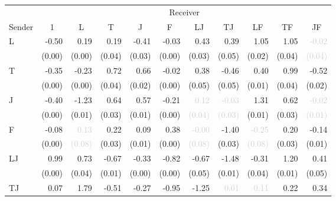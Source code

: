 \begin{tabular}{lrrrrrrrrrr}
\toprule
& \multicolumn{10}{c}{Receiver} \\
\cmidrule(l){2-11} 
Sender & \multicolumn{1}{c}{1} & \multicolumn{1}{c}{L} & \multicolumn{1}{c}{T} & \multicolumn{1}{c}{J} & \multicolumn{1}{c}{F} & \multicolumn{1}{c}{LJ} & \multicolumn{1}{c}{TJ} & \multicolumn{1}{c}{LF} & \multicolumn{1}{c}{TF} & \multicolumn{1}{c}{JF} \\
\midrule
\multirow{2}{*}{L} &-0.50 &\cellcolor{Gray}0.19 &0.19 &-0.41 &-0.03 &0.43 &0.39 &1.05 &1.05 &\textcolor{LightGray}{-0.02}\\
 &\tiny{(0.00)} &\cellcolor{Gray}\tiny{(0.00)} &\tiny{(0.04)} &\tiny{(0.03)} &\tiny{(0.00)} &\tiny{(0.03)} &\tiny{(0.05)} &\tiny{(0.02)} &\tiny{(0.04)} &\textcolor{LightGray}{\tiny{(0.04)}}\\[1ex]
\multirow{2}{*}{T} &-0.35 &-0.23 &\cellcolor{Gray}0.72 &0.66 &-0.02 &0.38 &-0.46 &0.40 &0.99 &-0.52\\
 &\tiny{(0.00)} &\tiny{(0.00)} &\cellcolor{Gray}\tiny{(0.04)} &\tiny{(0.02)} &\tiny{(0.00)} &\tiny{(0.05)} &\tiny{(0.05)} &\tiny{(0.01)} &\tiny{(0.04)} &\tiny{(0.02)}\\[1ex]
\multirow{2}{*}{J} &-0.40 &-1.23 &0.64 &\cellcolor{Gray}0.57 &-0.21 &\textcolor{LightGray}{0.12} &\textcolor{LightGray}{-0.03} &1.31 &0.62 &\textcolor{LightGray}{-0.02}\\
 &\tiny{(0.00)} &\tiny{(0.01)} &\tiny{(0.03)} &\cellcolor{Gray}\tiny{(0.01)} &\tiny{(0.00)} &\textcolor{LightGray}{\tiny{(0.04)}} &\textcolor{LightGray}{\tiny{(0.03)}} &\tiny{(0.01)} &\tiny{(0.03)} &\textcolor{LightGray}{\tiny{(0.01)}}\\[1ex]
\multirow{2}{*}{F} &-0.08 &\textcolor{LightGray}{0.13} &0.22 &0.09 &\cellcolor{Gray}0.38 &\textcolor{LightGray}{-0.00} &-1.40 &\textcolor{LightGray}{-0.25} &0.20 &-0.14\\
 &\tiny{(0.00)} &\textcolor{LightGray}{\tiny{(0.08)}} &\tiny{(0.03)} &\tiny{(0.01)} &\cellcolor{Gray}\tiny{(0.00)} &\textcolor{LightGray}{\tiny{(0.08)}} &\tiny{(0.03)} &\textcolor{LightGray}{\tiny{(0.08)}} &\tiny{(0.03)} &\tiny{(0.01)}\\[1ex]
\multirow{2}{*}{LJ} &0.99 &0.73 &-0.67 &-0.33 &-0.82 &\cellcolor{Gray}-0.67 &-1.48 &-0.31 &1.20 &0.41\\
 &\tiny{(0.00)} &\tiny{(0.04)} &\tiny{(0.01)} &\tiny{(0.00)} &\tiny{(0.00)} &\cellcolor{Gray}\tiny{(0.05)} &\tiny{(0.01)} &\tiny{(0.04)} &\tiny{(0.01)} &\tiny{(0.05)}\\[1ex]
\multirow{2}{*}{TJ} &0.07 &1.79 &-0.51 &-0.27 &-0.95 &-1.25 &\cellcolor{Gray}\textcolor{LightGray}{0.01} &\textcolor{LightGray}{0.11} &0.22 &0.34\\

\end{tabular}
